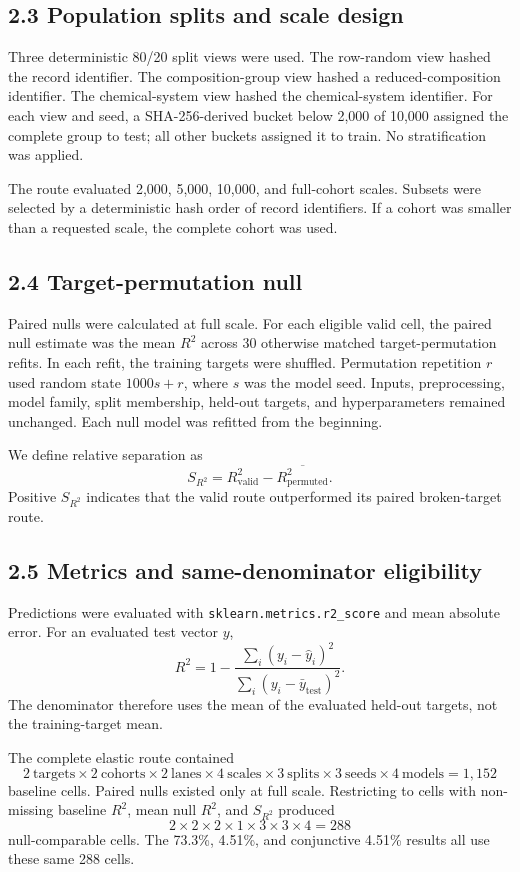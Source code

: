 \documentclass[10pt,a4paper]{article}
\begin{document}
\subsection{2.3 Population splits and scale design}
Three deterministic 80/20 split views were used. The row-random view hashed the record identifier. The composition-group view hashed a reduced-composition identifier. The chemical-system view hashed the chemical-system identifier. For each view and seed, a SHA-256-derived bucket below 2,000 of 10,000 assigned the complete group to test; all other buckets assigned it to train. No stratification was applied.

The route evaluated 2,000, 5,000, 10,000, and full-cohort scales. Subsets were selected by a deterministic hash order of record identifiers. If a cohort was smaller than a requested scale, the complete cohort was used.

\subsection{2.4 Target-permutation null}
Paired nulls were calculated at full scale. For each eligible valid cell, the paired null estimate was the mean $R^2$ across 30 otherwise matched target-permutation refits. In each refit, the training targets were shuffled. Permutation repetition $r$ used random state $1000s+r$, where $s$ was the model seed. Inputs, preprocessing, model family, split membership, held-out targets, and hyperparameters remained unchanged. Each null model was refitted from the beginning.

We define relative separation as
\[
S_{R^2}=R^2_{\mathrm{valid}}-\overline{R^2_{\mathrm{permuted}}}.
\]
Positive $S_{R^2}$ indicates that the valid route outperformed its paired broken-target route.

\subsection{2.5 Metrics and same-denominator eligibility}
Predictions were evaluated with \texttt{sklearn.metrics.r2\_score} and mean absolute error. For an evaluated test vector $y$,
\[
R^2=1-\frac{\sum_i(y_i-\hat y_i)^2}{\sum_i(y_i-\bar y_{\mathrm{test}})^2}.
\]
The denominator therefore uses the mean of the evaluated held-out targets, not the training-target mean.

The complete elastic route contained
\[
2\ \mathrm{targets}\times2\ \mathrm{cohorts}\times2\ \mathrm{lanes}\times4\ \mathrm{scales}\times3\ \mathrm{splits}\times3\ \mathrm{seeds}\times4\ \mathrm{models}=1{,}152
\]
baseline cells. Paired nulls existed only at full scale. Restricting to cells with non-missing baseline $R^2$, mean null $R^2$, and $S_{R^2}$ produced
\[
2\times2\times2\times1\times3\times3\times4=288
\]
null-comparable cells. The 73.3\%, 4.51\%, and conjunctive 4.51\% results all use these same 288 cells.
\end{document}
